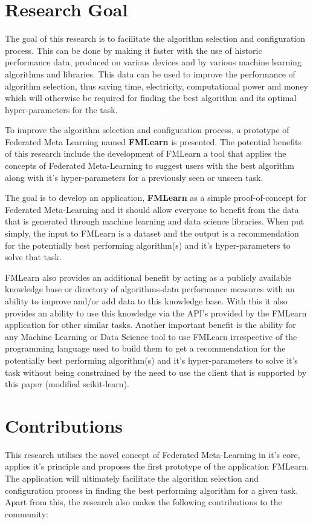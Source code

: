 \section{Research Goal}
The goal of this research is to facilitate the algorithm selection and configuration process. This can be done by making it faster with the use of historic performance data, produced on various devices and by various machine learning algorithms and libraries. This data can be used to improve the performance of algorithm selection, thus saving time, electricity, computational power and money which will otherwise be required for finding the best algorithm and its optimal hyper-parameters for the task.

To improve the algorithm selection and configuration process, a prototype of Federated Meta Learning named \textbf{FMLearn} is presented. The potential benefits of this research include the development of FMLearn a tool that applies the concepts of Federated Meta-Learning to suggest users with the best algorithm along with it's hyper-parameters for a previously seen or unseen task.

The goal is to develop an application, \textbf{FMLearn} as a simple proof-of-concept for Federated Meta-Learning and it should allow everyone to benefit from the data that is generated through machine learning and data science libraries. When put simply, the input to FMLearn is a dataset and the output is a recommendation for the potentially best performing algorithm(s) and it's hyper-parameters to solve that task.

FMLearn also provides an additional benefit by acting as a publicly available knowledge base or directory of algorithms-data performance measures with an ability to improve and/or add data to this knowledge base. With this it also provides an ability to use this knowledge via the API's provided by the FMLearn application for other similar tasks. Another important benefit is the ability for any Machine Learning or Data Science tool to use FMLearn irrespective of the programming language used to build them to get a recommendation for the potentially best performing algorithm(s) and it's hyper-parameters to solve it's task without being constrained by the need to use the client that is supported by this paper (modified scikit-learn).


\section{Contributions}
This research utilises the novel concept of Federated Meta-Learning in it's core, applies it's principle and proposes the first prototype of the application FMLearn. The application will ultimately facilitate the algorithm selection and configuration process in finding the best performing algorithm for a given task. Apart from this, the research also makes the following contributions to the community:

